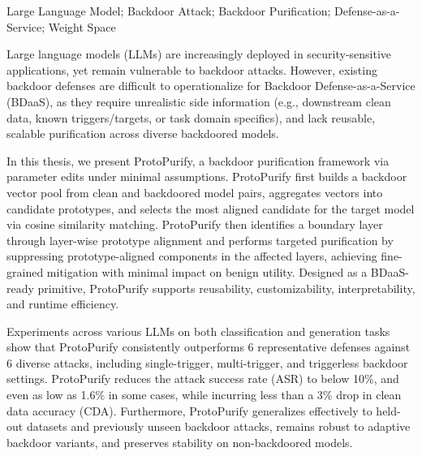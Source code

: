 \begin{enabstract}{Large Language Model; Backdoor Attack; Backdoor Purification; Defense-as-a-Service; Weight Space}

Large language models (LLMs) are increasingly deployed in security-sensitive applications, yet remain vulnerable to backdoor attacks. However, existing backdoor defenses are difficult to operationalize for Backdoor Defense-as-a-Service (BDaaS), as they require unrealistic side information (e.g., downstream clean data, known triggers/targets, or task domain specifics), and lack reusable, scalable purification across diverse backdoored models.

In this thesis, we present ProtoPurify, a backdoor purification framework via parameter edits under minimal assumptions. ProtoPurify first builds a backdoor vector pool from clean and backdoored model pairs, aggregates vectors into candidate prototypes, and selects the most aligned candidate for the target model via cosine similarity matching. ProtoPurify then identifies a boundary layer through layer-wise prototype alignment and performs targeted purification by suppressing prototype-aligned components in the affected layers, achieving fine-grained mitigation with minimal impact on benign utility. Designed as a BDaaS-ready primitive, ProtoPurify supports reusability, customizability, interpretability, and runtime efficiency.

Experiments across various LLMs on both classification and generation tasks show that ProtoPurify consistently outperforms 6 representative defenses against 6 diverse attacks, including single-trigger, multi-trigger, and triggerless backdoor settings. ProtoPurify reduces the attack success rate (ASR) to below 10\%, and even as low as 1.6\% in some cases, while incurring less than a 3\% drop in clean data accuracy (CDA). Furthermore, ProtoPurify generalizes effectively to held-out datasets and previously unseen backdoor attacks, remains robust to adaptive backdoor variants, and preserves stability on non-backdoored models.

\end{enabstract}
\newpage
